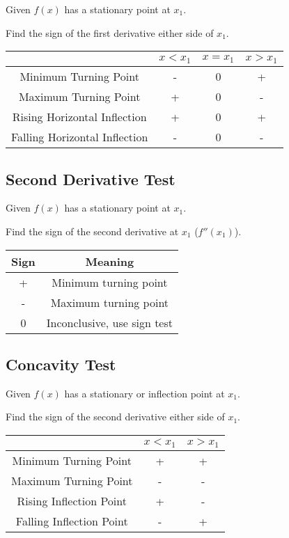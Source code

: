 \documentclass[a4paper,11pt]{article}
\begin{document}
Given $f(x)$ has a stationary point at $x_1$.

Find the sign of the first derivative either side of $x_1$.

\begin{center}
\begin{tabular}{c|c|c|c}
& $x < x_1$ & $x = x_1$ & $x > x_1$ \\
\hline
Minimum Turning Point         & - & 0 & + \\
Maximum Turning Point         & + & 0 & - \\
Rising Horizontal Inflection  & + & 0 & + \\
Falling Horizontal Inflection & - & 0 & - \\
\end{tabular}
\end{center}


\subsection{Second Derivative Test}

Given $f(x)$ has a stationary point at $x_1$.

Find the sign of the second derivative at $x_1$ ($f''(x_1)$).

\begin{center}
\begin{tabular}{c|c}
Sign & Meaning \\
\hline
+ & Minimum turning point \\
- & Maximum turning point \\
0 & Inconclusive, use sign test \\
\end{tabular}
\end{center}


\subsection{Concavity Test}

Given $f(x)$ has a stationary or inflection point at $x_1$.

Find the sign of the second derivative either side of $x_1$.

\begin{center}
\begin{tabular}{c|c|c}
& $x < x_1$ & $x > x_1$ \\
\hline
Minimum Turning Point    & + & + \\
Maximum Turning Point    & - & - \\
Rising Inflection Point  & + & - \\
Falling Inflection Point & - & + \\
\end{tabular}
\end{center}
\end{document}
